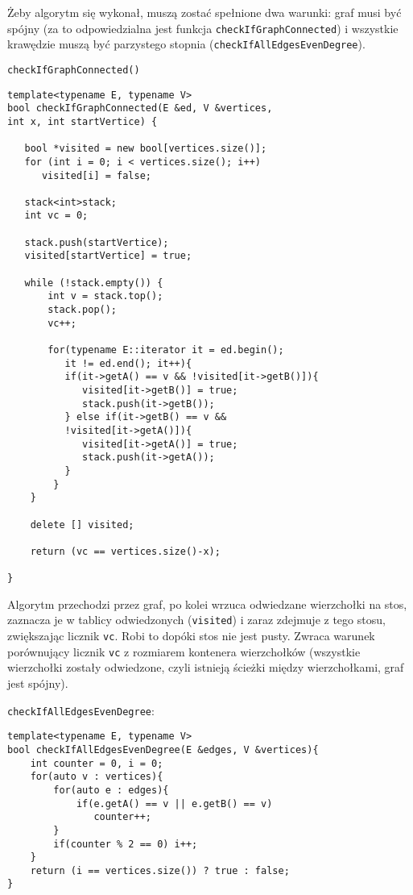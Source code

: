 \documentclass[11pt, a4paper]{article}
\begin{document}
Żeby algorytm się wykonał, muszą zostać spełnione dwa warunki: graf musi być spójny (za to odpowiedzialna jest funkcja \verb#checkIfGraphConnected#) i wszystkie krawędzie muszą być parzystego stopnia (\verb#checkIfAllEdgesEvenDegree#).

\verb#checkIfGraphConnected()#
\begin{lstlisting}[frame=single]
template<typename E, typename V>
bool checkIfGraphConnected(E &ed, V &vertices,
int x, int startVertice) {
    
   bool *visited = new bool[vertices.size()];
   for (int i = 0; i < vertices.size(); i++) 
      visited[i] = false;

   stack<int>stack;
   int vc = 0;
    
   stack.push(startVertice);
   visited[startVertice] = true;
    
   while (!stack.empty()) {
       int v = stack.top();
       stack.pop();
       vc++;
    
       for(typename E::iterator it = ed.begin();
          it != ed.end(); it++){
          if(it->getA() == v && !visited[it->getB()]){
             visited[it->getB()] = true;
             stack.push(it->getB());
          } else if(it->getB() == v &&
          !visited[it->getA()]){
             visited[it->getA()] = true;
             stack.push(it->getA());
          }
        }
    }

    delete [] visited;

    return (vc == vertices.size()-x);

}
\end{lstlisting}

Algorytm przechodzi przez graf, po kolei wrzuca odwiedzane wierzchołki na stos, zaznacza je w tablicy odwiedzonych (\verb#visited#) i zaraz zdejmuje z tego stosu, zwiększając licznik \verb#vc#. Robi to dopóki stos nie jest pusty. Zwraca warunek porównujący licznik \verb#vc# z rozmiarem kontenera wierzchołków (wszystkie wierzchołki zostały odwiedzone, czyli istnieją ścieżki między wierzchołkami, graf jest spójny).

\verb#checkIfAllEdgesEvenDegree#:
\begin{lstlisting}[frame=single]
template<typename E, typename V>
bool checkIfAllEdgesEvenDegree(E &edges, V &vertices){
    int counter = 0, i = 0;
    for(auto v : vertices){
        for(auto e : edges){
            if(e.getA() == v || e.getB() == v)
               counter++;
        }
        if(counter % 2 == 0) i++;
    }
    return (i == vertices.size()) ? true : false;
}
\end{lstlisting}
\end{document}
